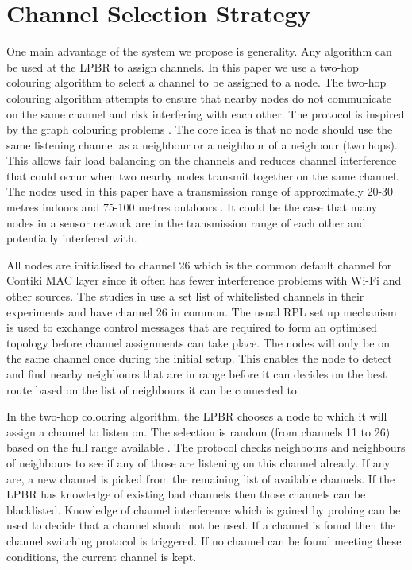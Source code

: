 \section{Channel Selection Strategy}
One main advantage of the system we propose is generality. Any algorithm can be used at the LPBR to assign channels. In this paper we use a two-hop colouring algorithm to select a channel to be assigned to a node.
The two-hop colouring algorithm attempts to ensure that nearby nodes do not communicate on the same channel and risk interfering with each other. The protocol is inspired by the graph colouring problems \cite{graphColouring}. The core idea is that no node should use the same listening channel as a neighbour or a neighbour of a neighbour (two hops).
This allows fair load balancing on the channels and reduces channel interference that could occur when two nearby nodes transmit together on the same channel. The nodes used in this paper have a transmission range of approximately 20-30 metres indoors and 75-100 metres outdoors \cite{telosb-datasheet}. It could be the case that many nodes in a sensor network are in the transmission range of each other and potentially interfered with.
 
All nodes are initialised to channel 26 which is the common default channel for Contiki MAC layer since it often has fewer interference problems with Wi-Fi and other sources. The studies in \cite{chrysso, micmac, watteyne} use a set list of whitelisted channels in their experiments and have channel 26 in common. The usual RPL set up mechanism is used to exchange control messages that are required to form an optimised topology before channel assignments can take place. The nodes will only be on the same channel once during the initial setup.
This enables the node to detect and find nearby neighbours that are in range before it can decides on the best route based on the list of neighbours it can be connected to. 
	
In the two-hop colouring algorithm, the LPBR chooses a node to which it will assign a channel to listen on. The selection is random (from channels 11 to 26) based on the full range available \cite{ieee802.15.4}. The protocol checks neighbours and neighbours of neighbours to see if any of those are listening on this channel already. If any are, a new channel is picked from the remaining list of available channels. If the LPBR has knowledge of existing bad channels then those channels can be blacklisted.  Knowledge of channel interference which is gained by probing can be used to decide that a channel should not be used. If a channel is found then the channel switching protocol is triggered. If no channel can be found meeting these conditions, the current channel is kept.  


